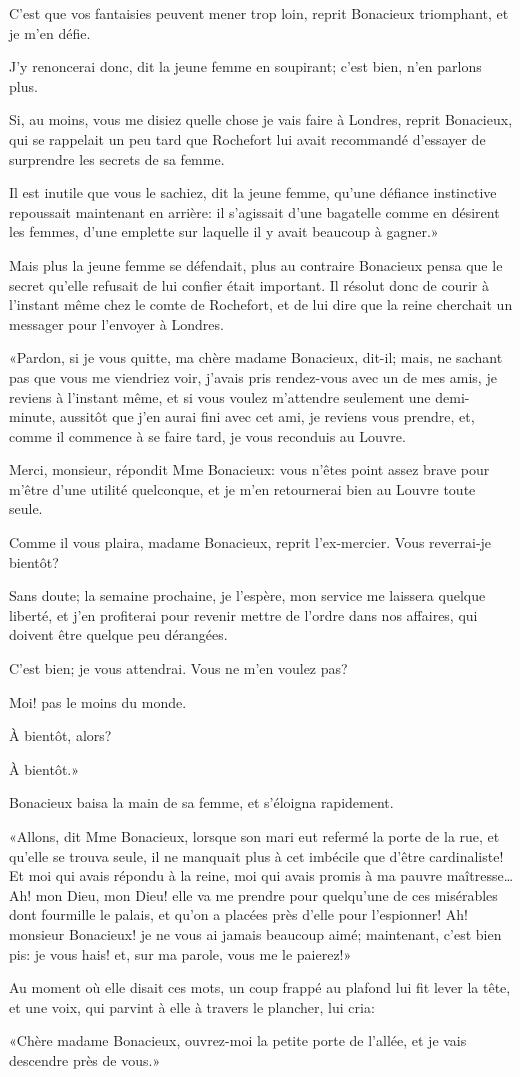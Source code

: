 \speak  C'est que vos fantaisies peuvent mener trop loin, reprit Bonacieux triomphant, et je m'en défie. 

\speak  J'y renoncerai donc, dit la jeune femme en soupirant; c'est bien, n'en parlons plus. 

\speak  Si, au moins, vous me disiez quelle chose je vais faire à Londres, reprit Bonacieux, qui se rappelait un peu tard que Rochefort lui avait recommandé d'essayer de surprendre les secrets de sa femme. 

\speak  Il est inutile que vous le sachiez, dit la jeune femme, qu'une défiance instinctive repoussait maintenant en arrière: il s'agissait d'une bagatelle comme en désirent les femmes, d'une emplette sur laquelle il y avait beaucoup à gagner.» 

Mais plus la jeune femme se défendait, plus au contraire Bonacieux pensa que le secret qu'elle refusait de lui confier était important. Il résolut donc de courir à l'instant même chez le comte de Rochefort, et de lui dire que la reine cherchait un messager pour l'envoyer à Londres. 

«Pardon, si je vous quitte, ma chère madame Bonacieux, dit-il; mais, ne sachant pas que vous me viendriez voir, j'avais pris rendez-vous avec un de mes amis, je reviens à l'instant même, et si vous voulez m'attendre seulement une demi-minute, aussitôt que j'en aurai fini avec cet ami, je reviens vous prendre, et, comme il commence à se faire tard, je vous reconduis au Louvre. 

\speak  Merci, monsieur, répondit Mme Bonacieux: vous n'êtes point assez brave pour m'être d'une utilité quelconque, et je m'en retournerai bien au Louvre toute seule. 

\speak  Comme il vous plaira, madame Bonacieux, reprit l'ex-mercier. Vous reverrai-je bientôt? 

\speak  Sans doute; la semaine prochaine, je l'espère, mon service me laissera quelque liberté, et j'en profiterai pour revenir mettre de l'ordre dans nos affaires, qui doivent être quelque peu dérangées. 

\speak  C'est bien; je vous attendrai. Vous ne m'en voulez pas? 

\speak  Moi! pas le moins du monde. 

\speak  À bientôt, alors? 

\speak  À bientôt.» 

Bonacieux baisa la main de sa femme, et s'éloigna rapidement. 

«Allons, dit Mme Bonacieux, lorsque son mari eut refermé la porte de la rue, et qu'elle se trouva seule, il ne manquait plus à cet imbécile que d'être cardinaliste! Et moi qui avais répondu à la reine, moi qui avais promis à ma pauvre maîtresse\dots Ah! mon Dieu, mon Dieu! elle va me prendre pour quelqu'une de ces misérables dont fourmille le palais, et qu'on a placées près d'elle pour l'espionner! Ah! monsieur Bonacieux! je ne vous ai jamais beaucoup aimé; maintenant, c'est bien pis: je vous hais! et, sur ma parole, vous me le paierez!» 

Au moment où elle disait ces mots, un coup frappé au plafond lui fit lever la tête, et une voix, qui parvint à elle à travers le plancher, lui cria: 

«Chère madame Bonacieux, ouvrez-moi la petite porte de l'allée, et je vais descendre près de vous.» 